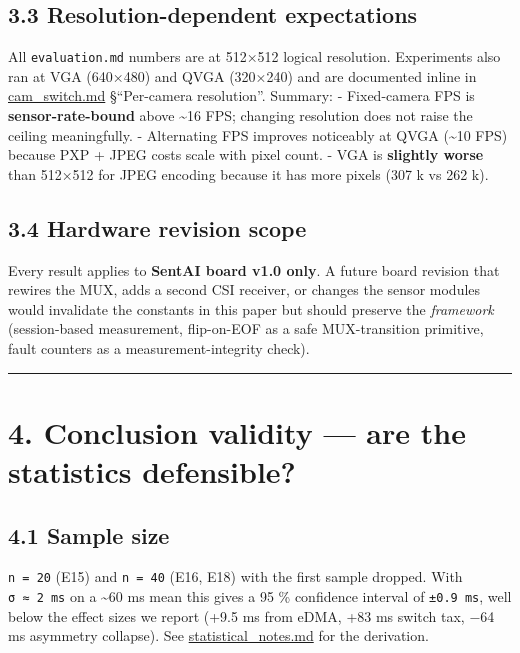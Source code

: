 \subsection{3.3 Resolution-dependent
expectations}\label{resolution-dependent-expectations}

All \texttt{evaluation.md} numbers are at 512×512 logical resolution.
Experiments also ran at VGA (640×480) and QVGA (320×240) and are
documented inline in \url{cam_switch.md} §``Per-camera resolution''.
Summary: - Fixed-camera FPS is \textbf{sensor-rate-bound} above
\textasciitilde16 FPS; changing resolution does not raise the ceiling
meaningfully. - Alternating FPS improves noticeably at QVGA
(\textasciitilde10 FPS) because PXP + JPEG costs scale with pixel count.
- VGA is \textbf{slightly worse} than 512×512 for JPEG encoding because
it has more pixels (307 k vs 262 k).

\subsection{3.4 Hardware revision scope}\label{hardware-revision-scope}

Every result applies to \textbf{SentAI board v1.0 only}. A future board
revision that rewires the MUX, adds a second CSI receiver, or changes
the sensor modules would invalidate the constants in this paper but
should preserve the \emph{framework} (session-based measurement,
flip-on-EOF as a safe MUX-transition primitive, fault counters as a
measurement-integrity check).

\begin{center}\rule{0.5\linewidth}{0.5pt}\end{center}

\section{4. Conclusion validity --- are the statistics
defensible?}\label{conclusion-validity-are-the-statistics-defensible}

\subsection{4.1 Sample size}\label{sample-size}

\texttt{n\ =\ 20} (E15) and \texttt{n\ =\ 40} (E16, E18) with the first
sample dropped. With \texttt{σ\ ≈\ 2\ ms} on a \textasciitilde60 ms mean
this gives a 95 \% confidence interval of \texttt{±0.9\ ms}, well below
the effect sizes we report (+9.5 ms from eDMA, +83 ms switch tax, −64 ms
asymmetry collapse). See \url{statistical_notes.md} for the derivation.

